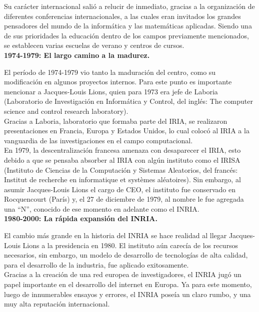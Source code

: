 Su carácter internacional salió a relucir de inmediato, gracias a la organización de diferentes conferencias internacionales, a las cuales eran invitados los grandes pensadores del mundo de la informática y las matemáticas aplicadas. Siendo una de sus prioridades la educación dentro de los campos previamente mencionados, se establecen varias escuelas de verano y centros de cursos.\\

\noindent
\textbf{1974-1979: El largo camino a la madurez.}

El período de 1974-1979 vio tanto la maduración del centro, como su modificación en algunos proyectos internos. Para este punto es importante mencionar a Jacques-Louis Lions, quien para 1973 era jefe de Laboria (Laboratorio de Investigación en Informática y Control, del inglés: The computer science and control research laboratory).\\

Gracias a Laboria, laboratorio que formaba parte del IRIA, se realizaron presentaciones en Francia, Europa y Estados Unidos, lo cual colocó al IRIA a la vanguardia de las investigaciones en el campo computacional. \\

En 1979, la descentralización francesa amenaza con desaparecer el IRIA, esto debido a que se pensaba absorber al IRIA con algún instituto como el IRISA (Instituto de Ciencias de la Computación y Sistemas Aleatorios, del francés: Institut de recherche en informatique et systèmes aléatoires). Sin embargo, al asumir Jacques-Louis Lions el cargo de CEO, el instituto fue conservado en Rocquencourt (París) y, el 27 de diciembre de 1979, al nombre le fue agregada una “N”, conocido de ese momento en adelante como el INRIA.\\

\noindent
\textbf{1980-2000: La rápida expansión del INRIA.}

El cambio más grande en la historia del INRIA se hace realidad al llegar Jacques-Louis Lions a la presidencia en 1980. El instituto aún carecía de los recursos necesarios, sin embargo, un modelo de desarrollo de tecnologías de alta calidad, para el desarrollo de la industria, fue aplicado exitosamente.\\

 Gracias a la creación de una red europea de investigadores, el INRIA jugó un papel importante en el desarrollo del internet en Europa. Ya para este momento, luego de innumerables ensayos y errores, el INRIA poseía un claro rumbo, y una muy alta reputación internacional.\\


